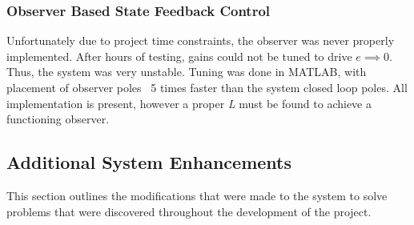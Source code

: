 \documentclass[12pt]{article}
\begin{document}
\subsubsection{Observer Based State Feedback Control}
Unfortunately due to project time constraints, the observer was never properly implemented. After hours of testing, gains could not be tuned to drive $e \implies 0$. Thus, the system was very unstable. Tuning was done in MATLAB, with placement of observer poles ~5 times faster than the system closed loop poles. All implementation is present, however a proper \textit{L} must be found to achieve a functioning observer. 

\subsection{Additional System Enhancements}
This section outlines the modifications that were made to the system to solve problems that were discovered throughout the development of the project.
\end{document}
